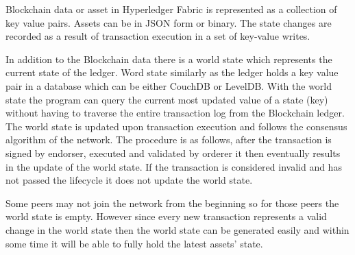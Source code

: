 Blockchain data or asset in Hyperledger Fabric is represented as a collection of key value pairs. Assets can be in JSON form or binary. The state changes are recorded as a result of transaction execution in a set of key-value writes. 


In addition to the Blockchain data there is a world state which represents the current state of the ledger. Word state similarly as the ledger holds a key value pair in a database which can be either CouchDB or LevelDB. With the world state the program can query the current most updated value of a state (key) without having to traverse the entire transaction log from the Blockchain ledger. The world state is updated upon transaction execution and follows the consensus algorithm of the network. The procedure is as follows, after the transaction is signed by endorser, executed and validated by orderer it then eventually results in the update of the world state. If the transaction is considered invalid and has not passed the lifecycle it does not update the world state. 

Some peers may not join the network from the beginning so for those peers the world state is empty. However since every new transaction represents a valid change in the world state then the world state can be generated easily and within some time it will be able to fully hold the latest assets' state.  